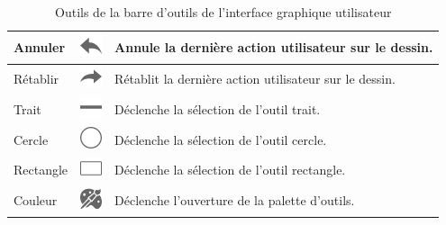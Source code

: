 \documentclass[11pt,a4paper,oldfontcommands]{memoir}
\begin{document}
\begin{table}[h]
\begin{tabular}{|l|l|l|}
Annuler                              & \includegraphics{images/icon-undo.png}                                      & Annule la dernière action utilisateur sur le dessin.                                               \\ \hline
Rétablir                             & \includegraphics{images/icon-redo.png}                                     & Rétablit la dernière action utilisateur sur le dessin.                                             \\ \hline
Trait                                & \includegraphics{images/icon-dash.png}                                     & Déclenche la sélection de l'outil trait.                                                           \\ \hline
Cercle                               & \includegraphics{images/icon-ellipse.png}                                      & Déclenche la sélection de l'outil cercle.                                                          \\ \hline
Rectangle                            & \includegraphics{images/icon-rectangle.png}                                      & Déclenche la sélection de l'outil rectangle.                                                       \\ \hline
Couleur                              & \includegraphics{images/icon-color.png}                                      & Déclenche l'ouverture de la palette d'outils.                                                      \\ \hline
\end{tabular}
\caption{Outils de la barre d'outils de l'interface graphique utilisateur}
\end{table}
\end{document}
